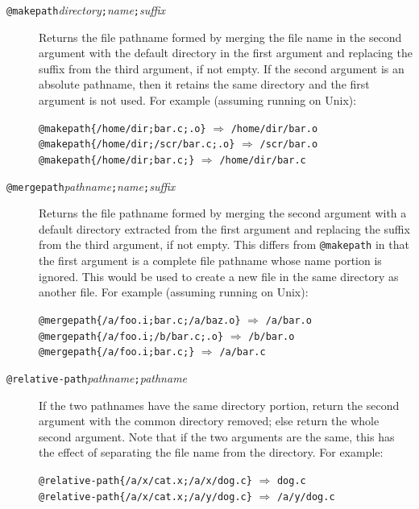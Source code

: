\begin{description}
\item[{\tt @makepath\ttlb}{\it directory}{\tt ;}{\it name}{\tt ;}{\it suffix}{\tt \ttrb}]
Returns the file pathname formed by merging the file name in the second
argument with the
default directory in the first argument and replacing the suffix from
the third argument, if not empty.  If the second argument is an absolute
pathname, then it retains the same directory and the first argument is
not used.
For example (assuming running on Unix):
\begin{flushleft}
   \verb|@makepath{/home/dir;bar.c;.o}|  $\Rightarrow$ \verb|/home/dir/bar.o|\\
   \verb|@makepath{/home/dir;/scr/bar.c;.o}|  $\Rightarrow$ \verb|/scr/bar.o|\\
   \verb|@makepath{/home/dir;bar.c;}|  $\Rightarrow$ \verb|/home/dir/bar.c|
\end{flushleft}

\item[{\tt @mergepath\ttlb}{\it pathname}{\tt ;}{\it name}{\tt ;}{\it suffix}{\tt \ttrb}]
Returns the file pathname formed by merging the second argument with a
default directory extracted from the first argument and replacing the
suffix from the third argument, if not empty.  This differs from
\verb/@makepath/ in that the first argument is a complete file pathname
whose name portion is ignored.  This would be used to create a new file
in the same directory as another file.
For example (assuming running on Unix):
\begin{flushleft}
   \verb|@mergepath{/a/foo.i;bar.c;/a/baz.o}|  $\Rightarrow$ \verb|/a/bar.o|\\
   \verb|@mergepath{/a/foo.i;/b/bar.c;.o}|  $\Rightarrow$ \verb|/b/bar.o|\\
   \verb|@mergepath{/a/foo.i;bar.c;}|  $\Rightarrow$ \verb|/a/bar.c|
\end{flushleft}

\item[{\tt @relative-path\ttlb}{\it pathname}{\tt ;}{\it pathname}{\tt \ttrb}]
If the two pathnames have the same directory portion, return the second
argument with the common directory removed; else return the whole second
argument.  Note that if the two arguments are the same, this has the
effect of separating the file name from the directory.
For example:
\begin{flushleft}
  \verb|@relative-path{/a/x/cat.x;/a/x/dog.c}| $\Rightarrow$ \verb|dog.c|\\
  \verb|@relative-path{/a/x/cat.x;/a/y/dog.c}| $\Rightarrow$ \verb|/a/y/dog.c|
\end{flushleft}


\end{description}
